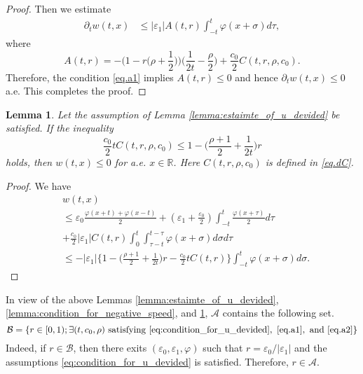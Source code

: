 \documentclass[reqno]{amsart}
\newtheorem{Lemma}[Theorem]{Lemma}
\begin{document}
\begin{proof}
Then we estimate
	\begin{align}
	\label{HH2}
	\partial_t w(t,x)
	&\leq |\varepsilon_1| A(t,r) \int_{-t}^t  \varphi(x+\sigma) d\tau,
	\end{align}
where 
	\[
	A(t,r) =
	- \bigg(1 - r \bigg( \rho + \frac{1}{2} \bigg) \bigg) \bigg( \frac{1}{2t} - \frac \rho 2 \bigg)
	+ \frac{c_0}{2} C(t,r, \rho,c_0).
	\]
Therefore, the condition \eqref{eq.a1} implies $A(t,r) \leq 0$
and hence $\partial_t w(t,x) \leq 0$ a.e.
This completes the proof.
\end{proof}


\begin{Lemma}
\label{lemma:condition_for_negative_position}
Let the assumption of Lemma \ref{lemma:estaimte_of_u_devided}
be satisfied.
If the inequality
	\begin{equation}\label{eq.a2}
   \frac{c_0}{2}t  C(t,r,\rho,c_0)
	\leq 1 - \bigg( \frac{\rho+1}{2} + \frac{1}{2t}\bigg) r
	\end{equation}
holds, then
$ w (t,x) \leq 0$ for a.e. $x \in \mathbb{R}$.
Here $C(t,r,\rho,c_0)$ is defined in \eqref{eq.dC}.
\end{Lemma}
 \begin{proof}
     We have
     \begin{align*}
	&w(t,x)\\
	&\leq \varepsilon_0 \frac{\varphi(x+t)+ \varphi(x-t)}{2} 
	+ \left(\varepsilon_1 + \frac{\varepsilon_0}{2} \right) \int_{-t}^{t}\frac{\varphi(x+\tau)}{2} d\tau \\
	& + \frac{c_0}{2}|\varepsilon_1| C(t,r) \int_0^t \int_{\tau-t}^{t-\tau}\varphi(x+\sigma) d\sigma d\tau\\
	&\leq
	- |\varepsilon_1|
	\bigg\{
		1
		- \bigg( \frac{\rho+1}{2} + \frac{1}{2t}\bigg) r
		- \frac{c_0}{2} t  C(t,r)
	\bigg\}
	\int_{-t}^t \varphi(x+\sigma) d\sigma.
	\end{align*}
 \end{proof}

In view of the above Lemmas
\ref{lemma:estaimte_of_u_devided},
\ref{lemma:condition_for_negative_speed},
and \ref{lemma:condition_for_negative_position},
$\mathcal{A}$ contains the following set.
	\[
	\mathcal{B}
	= \{r \in [0,1); \exists (t,c_0,\rho)\
	\mathrm{satisfying}\
	\eqref{eq:condition_for_u_devided},\
	\eqref{eq.a1},\
	\mathrm{and}\ \eqref{eq.a2}\}
	\]
Indeed, if $r \in \mathcal{B}$, then
there exits $(\varepsilon_0, \varepsilon_1, \varphi)$
such that $r=\varepsilon_0/|\varepsilon_1|$ and the assumptions
\eqref{eq:condition_for_u_devided} is satisfied.
Therefore, $r \in \mathcal{A}$.
\end{document}
